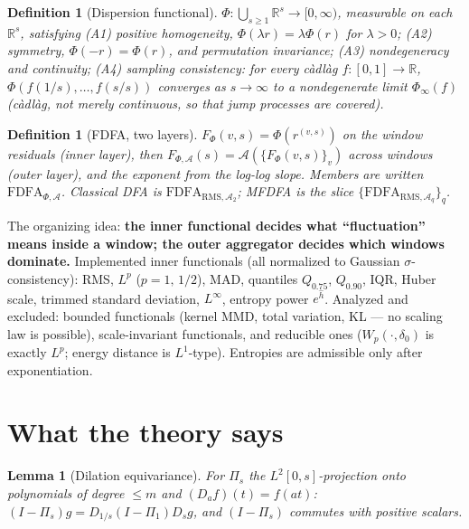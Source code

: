 \documentclass[10pt, letterpaper]{paper}
\newtheorem{lemma}[theorem]{Lemma}
\newtheorem{definition}[theorem]{Definition}
\theoremstyle{remark}
\newcommand{\R}{\mathbb{R}}
\newcommand{\Phifun}{\Phi}
\begin{document}
\begin{definition}[Dispersion functional]\label{def:phi}
$\Phifun:\bigcup_{s\ge1}\R^s\to[0,\infty)$, measurable on each
$\R^s$, satisfying
(A1) \emph{positive homogeneity}, $\Phifun(\lambda r)=\lambda\Phifun(r)$
for $\lambda>0$;
(A2) \emph{symmetry}, $\Phifun(-r)=\Phifun(r)$, and permutation
invariance;
(A3) \emph{nondegeneracy and continuity};
(A4) \emph{sampling consistency}: for every c\`adl\`ag
$f:[0,1]\to\R$, $\Phifun(f(1/s),\dots,f(s/s))$ converges as
$s\to\infty$ to a nondegenerate limit $\Phifun_\infty(f)$
(c\`adl\`ag, not merely continuous, so that jump processes are
covered).
\end{definition}

\begin{definition}[FDFA, two layers]\label{def:fdfa}
$F_\Phifun(v,s)=\Phifun(r^{(v,s)})$ on the window residuals (inner
layer), then
$F_{\Phifun,\mathcal A}(s)=\mathcal A(\{F_\Phifun(v,s)\}_v)$ across
windows (outer layer), and the exponent from the log-log slope.
Members are written $\mathrm{FDFA}_{\Phifun,\mathcal A}$. Classical
DFA is $\mathrm{FDFA}_{\mathrm{RMS},\mathcal A_2}$; MFDFA is the
slice $\{\mathrm{FDFA}_{\mathrm{RMS},\mathcal A_q}\}_q$.
\end{definition}

The organizing idea: \textbf{the inner functional decides what
``fluctuation'' means inside a window; the outer aggregator decides
which windows dominate.} Implemented inner functionals (all
normalized to Gaussian $\sigma$-consistency): RMS, $L^p$
($p=1,\,1/2$), MAD, quantiles $Q_{0.75}$, $Q_{0.90}$, IQR, Huber
scale, trimmed standard deviation, $L^\infty$, entropy power
$e^{\hat h}$. Analyzed and excluded: bounded functionals (kernel
MMD, total variation, KL --- no scaling law is possible),
scale-invariant functionals, and reducible ones
($W_p(\cdot,\delta_0)$ is exactly $L^p$; energy distance is
$L^1$-type). Entropies are admissible only after exponentiation.

\section{What the theory says}

\begin{lemma}[Dilation equivariance]\label{lem:commute}
For $\Pi_s$ the $L^2[0,s]$-projection onto polynomials of degree
$\le m$ and $(D_af)(t)=f(at)$:
$(I-\Pi_s)g=D_{1/s}(I-\Pi_1)D_sg$, and $(I-\Pi_s)$ commutes with
positive scalars.
\end{lemma}
\end{document}
